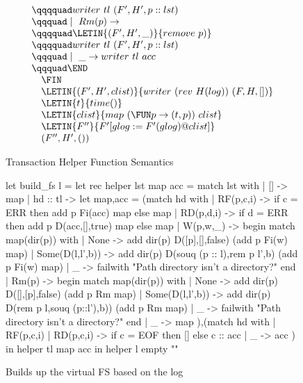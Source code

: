 \begin{figure*}
\begin{minipage}[t]{0.5\linewidth}
\begin{displaymath}
\begin{array}{l}
\qqqquad writer~tl~(F',H',p :: lst) \\
\qqquad \mid~Rm(p) \rightarrow \\
\qqqquad \LETIN{(F',H',\_)}{remove~p)} \\
\qqqquad writer~tl~(F',H',p :: lst) \\
\qqquad \mid~\_ \rightarrow writer~tl~acc \\ 
\qqquad \END \\
\quad \FIN \\
\quad \LETIN{(F',H',clist)}{writer~(rev~H(log))~(F,H,[])} \\
\quad \LETIN{t}{time()} \\
\quad \LETIN{clist}{map~(\FUN p \rightarrow (t,p))~clist} \\
\quad \LETIN{F''}{F'[glog := F'(glog) @ clist]} \\
\quad (F'',H',())
\end{array}
\end{displaymath}
\end{minipage}
\caption{Transaction Helper Function Semantics}
\end{figure*}

\begin{figure}
\begin{code}
let build\_fs l =
  let rec helper lst map acc =
  match lst with
    | []       -> map
    | hd :: tl ->
      let map,acc =
      (match hd with
      | RF(p,c,i)  ->
        if c = ERR
        then add p Fi(acc) map
        else map
      | RD(p,d,i)  -> 
        if d = ERR
        then add p D(acc,[],true) map
        else map
      | W(p,w,_)   ->
        begin
        match map(dir(p)) with
        | None            -> 
          add dir(p) D([p],[],false) (add p Fi(w) map)
        | Some(D(l,l',b)) -> 
          add dir(p) D(souq (p :: l),rem p l',b) (add p Fi(w) map)
        | \_              -> 
          failwith "Path directory isn't a directory?"
        end
      | Rm(p)      -> 
        begin
        match map(dir(p)) with
        | None            -> 
          add dir(p) D([],[p],false) (add p Rm map)
        | Some(D(l,l',b)) -> 
          add dir(p) D(rem p l,souq (p::l'),b)) (add p Rm map)
        | \_               -> 
          failwith "Path directory isn't a directory?"
        end
      | \_        -> map
      ),(match hd with
      | RF(p,c,i) 
      | RD(p,c,i)  -> 
        if c = EOF
        then []
        else c :: acc
      | \_        -> acc
      )
      in
      helper tl map acc
  in 
  helper l empty ""
\end{code}
\caption{Builds up the virtual FS based on the log}
\end{figure}

